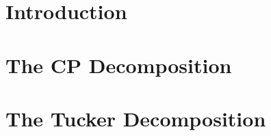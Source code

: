 \documentclass[MS]{wfuthesis}
\begin{document}
    \chapters{}
    \chapter{\textbf{Introduction}}
        
        \newpage





    \chapter{\textbf{The CP Decomposition}}
        
        \newpage





    \chapter{\textbf{The Tucker Decomposition}}
        
        \newpage





    \printbibliography
    




\end{document}
